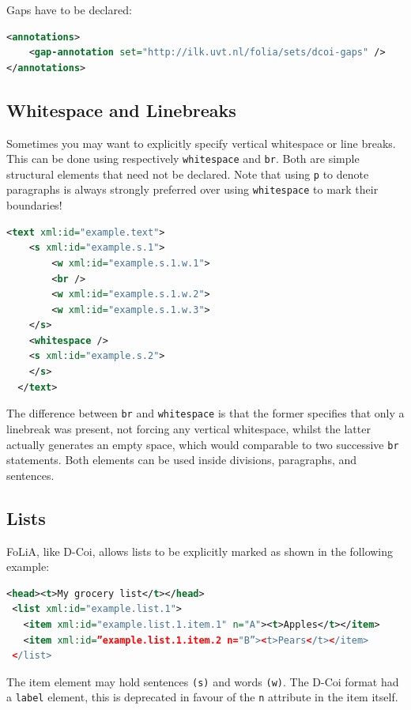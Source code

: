 \documentclass[a4paper,12pt]{report}
\begin{document}
Gaps have to be declared:

\begin{lstlisting}[language=xml]
<annotations>
    <gap-annotation set="http://ilk.uvt.nl/folia/sets/dcoi-gaps" />
</annotations>
\end{lstlisting}

\subsection{Whitespace and Linebreaks}

Sometimes you may want to explicitly specify vertical whitespace or line breaks. This can be done using respectively \texttt{whitespace} and \texttt{br}. Both are simple structural elements that need not be declared. Note that using \texttt{p} to denote paragraphs is always strongly preferred over using \texttt{whitespace} to mark their boundaries!

\begin{lstlisting}[language=xml]
  <text xml:id="example.text">
    <s xml:id="example.s.1">
        <w xml:id="example.s.1.w.1">
        <br />
        <w xml:id="example.s.1.w.2">
        <w xml:id="example.s.1.w.3">
    </s>
    <whitespace />
    <s xml:id="example.s.2">
    </s>
  </text>
\end{lstlisting}

The difference between \texttt{br} and \texttt{whitespace} is that the former specifies that only a linebreak was present, not forcing any vertical whitespace, whilst the latter actually generates an empty space, which would comparable to two successive \texttt{br} statements. Both elements can be used inside divisions, paragraphs, and sentences.

\subsection{Lists}

FoLiA, like D-Coi, allows lists to be explicitly marked as shown in the following example:

\begin{lstlisting}[language=xml]
 <head><t>My grocery list</t></head>
 <list xml:id="example.list.1">
   <item xml:id="example.list.1.item.1" n="A"><t>Apples</t></item>
   <item xml:id=”example.list.1.item.2 n="B”><t>Pears</t></item>
 </list>
\end{lstlisting}

The item element may hold sentences \texttt{(s)} and words \texttt{(w)}. The D-Coi format had a \texttt{label} element, this is deprecated in favour of the \texttt{n} attribute in the item itself.
\end{document}

